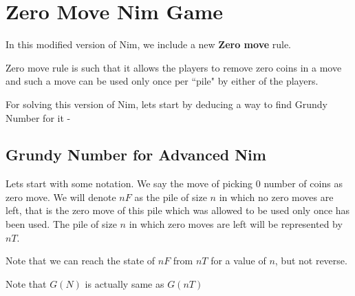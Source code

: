 \documentclass[11pt]{article}
\begin{document}
\section{Zero Move Nim Game}
In this modified version of Nim, we include a new \textbf{Zero move} rule.
\begin{definition}
    Zero move rule is such that it allows the players to remove zero coins in a move and such a move can be used only once per ``pile" by either of the players.
\end{definition}
For solving this version of Nim, lets start by deducing a way to find Grundy Number for it -

\subsection{Grundy Number for Advanced Nim}
Lets start with some notation. We say the move of picking 0 number of coins as zero move. We will denote $nF$ as the pile of size $n$ in which no zero moves are left, that is the zero move of this pile which was allowed to be used only once has been used. The pile of size $n$ in which zero moves are left will be represented by $nT$. 
\begin{remark}
    Note that we can reach the state of $nF$ from $nT$ for a value of $n$, but not reverse.
\end{remark}
\begin{remark}
    Note that $G(N)$ is actually same as $G(nT)$
\end{remark}
\end{document}

